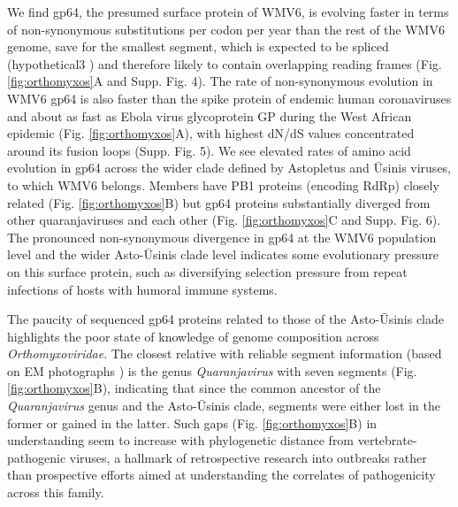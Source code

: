 \documentclass[11pt,twocolumn]{article}
\begin{document}
We find gp64, the presumed surface protein of WMV6, is evolving faster in terms of non-synonymous substitutions per codon per year than the rest of the WMV6 genome, save for the smallest segment, which is expected to be spliced (hypothetical3 \citep{batson_single_2021}) and therefore likely to contain overlapping reading frames (Fig. \ref{fig:orthomyxos}A and Supp. Fig. 4).
The rate of non-synonymous evolution in WMV6 gp64 is also faster than the spike protein of endemic human coronaviruses \citep{kistler_evidence_2021} and about as fast as Ebola virus glycoprotein GP during the West African epidemic \citep{park_ebola_2015}(Fig. \ref{fig:orthomyxos}A), with highest dN/dS values concentrated around its fusion loops \citep{garry_proteomics_2008} (Supp. Fig. 5).
We see elevated rates of amino acid evolution in gp64 across the wider clade defined by Astopletus and \={U}sinis viruses, to which WMV6 belongs. Members have PB1 proteins (encoding RdRp) closely related (Fig. \ref{fig:orthomyxos}B) but gp64 proteins substantially diverged from other quaranjaviruses and each other (Fig. \ref{fig:orthomyxos}C and Supp. Fig. 6).
The pronounced non-synonymous divergence in gp64 at the WMV6 population level and the wider Asto-\={U}sinis clade level indicates some evolutionary pressure on this surface protein, such as diversifying selection pressure from repeat infections of hosts with humoral immune systems.

The paucity of sequenced gp64 proteins related to those of the Asto-\={U}sinis clade highlights the poor state of knowledge of genome composition across \textit{Orthomyxoviridae}.
The closest relative with reliable segment information (based on EM photographs \citep{allison_cyclic_2015}) is the genus \textit{Quaranjavirus} with seven segments (Fig. \ref{fig:orthomyxos}B), indicating that since the common ancestor of the \textit{Quaranjavirus} genus and the Asto-\={U}sinis clade, segments were either lost in the former or gained in the latter.
Such gaps (Fig. \ref{fig:orthomyxos}B) in understanding seem to increase with phylogenetic distance from vertebrate-pathogenic viruses, a hallmark of retrospective research into outbreaks rather than prospective efforts aimed at understanding the correlates of pathogenicity across this family.
\end{document}
